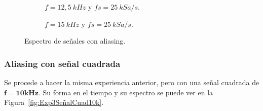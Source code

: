       \begin{figure}[H]
        \centering
        \begin{subfigure}[H]{0.48\textwidth}
          \caption{$f=12,5~kHz$ y $fs=25~kSa/s$.}
          \label{fig:Exp3AliasSeñal12_5kHz}
        \end{subfigure}
        \hfill 
        \begin{subfigure}[H]{0.48\textwidth}
          \caption{$f=15~kHz$ y $fs=25~kSa/s$.}
          \label{fig:Exp3AliasSeñal15kHz}
        \end{subfigure}

        \caption{Espectro de señales con aliasing.}
        \label{fig:Exp3SeñalConAlias}
      \end{figure}

      \subsubsection{Aliasing con señal cuadrada}
      Se procede a hacer la misma experiencia anterior, pero con una señal cuadrada de $\mathbf{f=10kHz}$.
      Su forma en el tiempo y su espectro se puede ver en la Figura~\ref{fig:Exp3SeñalCuad10k}.

